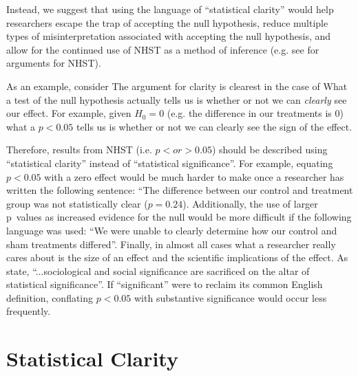 Instead, we suggest that using the language of ``statistical clarity'' would help researchers escape the trap of accepting 
the null hypothesis, reduce multiple types of misinterpretation associated with accepting the null hypothesis, and allow for
the continued use of NHST as a method of inference (e.g. see \citealt{Abelson1997} for arguments for NHST).

As an example, consider 
The argument for clarity is clearest in the case of What a test of the
null hypothesis actually tells us is whether or not we can \emph{clearly} see our effect. For example, given $H_{0} = 0$ (e.g.
the difference in our treatments is 0) what a $p < 0.05$ tells us is whether or not we can clearly see the sign of the effect. 

Therefore, results from NHST (i.e. $p < or > 0.05$) should be described using ``statistical clarity'' instead of ``statistical 
significance''. For example, equating $p < 0.05$ with a zero effect would be much harder to make once a researcher has written 
the following sentence: ``The difference between our control and treatment group was not statistically clear ($p = 0.24$). 
Additionally, the use of larger p~values as increased evidence for the null would be more difficult if the following language
was used: ``We were unable to clearly determine how our control and sham treatments differed''. Finally, in almost all cases 
what a researcher really cares about is the size of an effect and the scientific implications of the effect.  As 
\citet{Bernardietal.2017} state, ``...sociological and social significance are sacrificed on the altar of statistical 
significance''. If ``significant'' were to reclaim its common English definition, conflating $p < 0.05$ with substantive
significance would occur less frequently.

\section*{Statistical Clarity}


